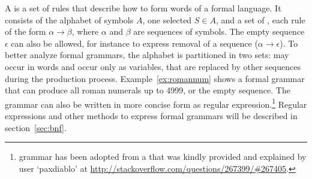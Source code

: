 A  is a set of rules that describe how to form words of a
formal language. It consists of the alphabet of symbols $A$, one selected
 $S\in A$, and a set of , each
rule of the form $\alpha \rightarrow \beta$, where $\alpha$ and $\beta$ are
sequences of symbols. The empty sequence $\epsilon$ can also be allowed, for
instance to express removal of a sequence  ($\alpha \rightarrow \epsilon$).  To
better analyze formal grammars, the alphabet is partitioned in two sets:
 may occur in words and 
occur only as variables, that are replaced by other sequences during the
production process.  Example~\ref{ex:romannum} shows a formal grammar that can
produce all roman numerals up to 4999, or the empty sequence. The grammar can
also be written in more concise form as regular expression.\footnote{%
grammar has been adopted from a  that was kindly
provided and explained by user `paxdiablo' at
\url{http://stackoverflow.com/questions/267399/\#267405}.} Regular expressions
and other methods to express formal grammars will be described in
section~\ref{sec:bnf}.

